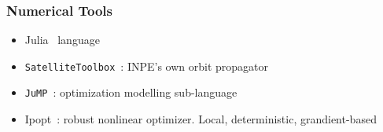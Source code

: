 \documentclass{beamer}
\begin{document}
\begin{frame}
    \frametitle{Numerical Tools}

    \begin{itemize}
        \item<2-> Julia~\cite{Julia-2017} language
        \item<3-> \texttt{SatelliteToolbox}~\cite{satellitetoolbox}: INPE's own orbit propagator
        \item<4-> \texttt{JuMP}~\cite{jump}: optimization modelling sub-language
        \item<5-> Ipopt~\cite{ipopt}: robust nonlinear optimizer. Local, deterministic, grandient-based
    \end{itemize}
    
    \begin{figure}[htbp]
        \centering
\end{figure}
\end{frame}
\end{document}
